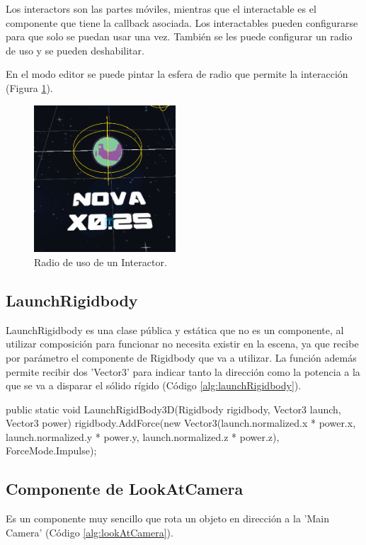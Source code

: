 Los interactors son las partes móviles, mientras que el interactable es el componente que tiene la callback asociada. Los interactables pueden configurarse para que solo 
se puedan usar una vez. También se les puede configurar un radio de uso y se pueden deshabilitar. 

En el modo editor se puede pintar la esfera de radio que permite la interacción (Figura \ref{fig:interactor}).

\begin{figure}[H]
  \centering
    \includegraphics[width=200px,clip=true]{interactor.png}
  \caption{Radio de uso de un Interactor.}
  \label{fig:interactor}
\end{figure}

\subsection{LaunchRigidbody}
LaunchRigidbody es una clase pública y estática que no es un componente, al utilizar composición para funcionar no necesita existir en la escena, ya que recibe por parámetro 
el componente de Rigidbody que va a utilizar. La función además permite recibir dos 'Vector3' para indicar tanto la dirección como la potencia a la que se va a disparar el 
sólido rígido (Código \ref{alg:launchRigidbody}).

\begin{mypython}[caption={Funcionamiento de LaunchRigidbody.},label={alg:launchRigidbody}]
    public static void LaunchRigidBody3D(Rigidbody rigidbody, Vector3 launch, Vector3 power)
    {
        rigidbody.AddForce(new Vector3(launch.normalized.x * power.x, launch.normalized.y * power.y, launch.normalized.z * power.z), ForceMode.Impulse);
    }
\end{mypython}
    
\subsection{Componente de LookAtCamera}
Es un componente muy sencillo que rota un objeto en dirección a la 'Main Camera' (Código \ref{alg:lookAtCamera}).

